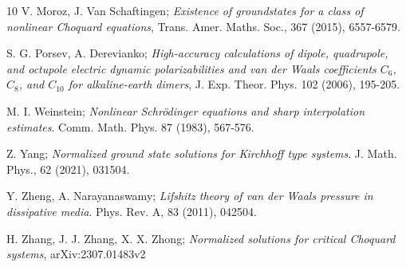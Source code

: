 \documentclass[reqno]{amsart}
\begin{document}
\begin{thebibliography}{10}
 V. Moroz, J. Van Schaftingen;
\emph{Existence of groundstates for a class of nonlinear Choquard
equations}, Trans. Amer. Maths. Soc., 367 (2015), 6557-6579.

 S. G. Porsev, A. Derevianko;
\emph{High-accuracy calculations of dipole, quadrupole, and octupole electric dynamic 
polarizabilities and van der Waals coefficients $C_6$, $C_8$, and $C_{10}$ 
for alkaline-earth dimers}, J. Exp. Theor. Phys. 102 (2006), 195-205.

 M. I. Weinstein;
\emph{Nonlinear Schr\"{o}dinger equations and sharp interpolation estimates}.
Comm. Math. Phys. 87 (1983), 567-576.

 Z. Yang;
\emph{Normalized ground state solutions for Kirchhoff type systems}. 
J. Math. Phys., 62 (2021), 031504.

 Y. Zheng, A. Narayanaswamy;
\emph{Lifshitz theory of van der Waals pressure in dissipative media}. 
Phys. Rev. A, 83 (2011), 042504.

 H. Zhang, J. J. Zhang, X. X. Zhong;
\emph{Normalized solutions for critical Choquard systems}, arXiv:2307.01483v2

\end{thebibliography}
\end{document}
